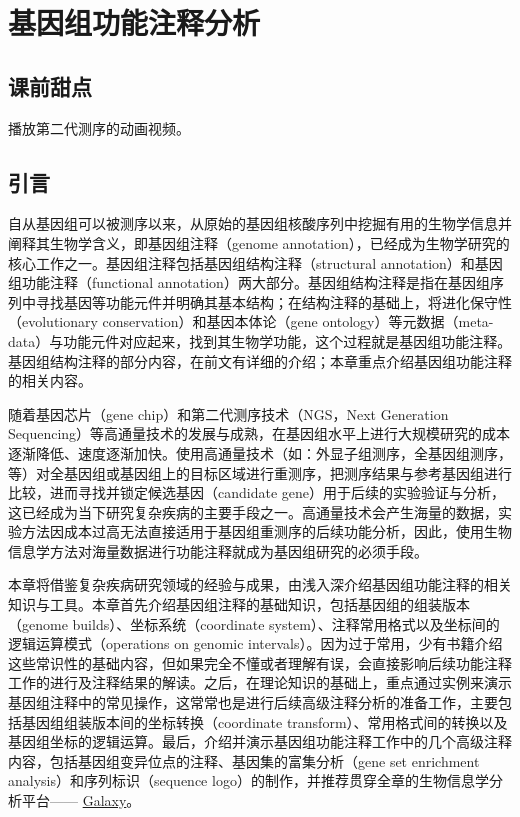 




\setcounter{chapter}{4}
\chapter{基因组功能注释分析}

\section{课前甜点}  
播放第二代测序的动画视频。

\section{引言}
自从基因组可以被测序以来，从原始的基因组核酸序列中挖掘有用的生物学信息并阐释其生物学含义，即基因组注释（genome annotation），已经成为生物学研究的核心工作之一。基因组注释包括基因组结构注释（structural annotation）和基因组功能注释（functional annotation）两大部分。基因组结构注释是指在基因组序列中寻找基因等功能元件并明确其基本结构；在结构注释的基础上，将进化保守性（evolutionary conservation）和基因本体论（gene ontology）等元数据（meta-data）与功能元件对应起来，找到其生物学功能，这个过程就是基因组功能注释。基因组结构注释的部分内容，在前文有详细的介绍；本章重点介绍基因组功能注释的相关内容。

随着基因芯片（gene chip）和第二代测序技术（NGS，Next Generation Sequencing）等高通量技术的发展与成熟，在基因组水平上进行大规模研究的成本逐渐降低、速度逐渐加快。使用高通量技术（如：外显子组测序，全基因组测序，等）对全基因组或基因组上的目标区域进行重测序，把测序结果与参考基因组进行比较，进而寻找并锁定候选基因（candidate gene）用于后续的实验验证与分析，这已经成为当下研究复杂疾病的主要手段之一。高通量技术会产生海量的数据，实验方法因成本过高无法直接适用于基因组重测序的后续功能分析，因此，使用生物信息学方法对海量数据进行功能注释就成为基因组研究的必须手段。

本章将借鉴复杂疾病研究领域的经验与成果，由浅入深介绍基因组功能注释的相关知识与工具。本章首先介绍基因组注释的基础知识，包括基因组的组装版本（genome builds）、坐标系统（coordinate system）、注释常用格式以及坐标间的逻辑运算模式（operations on genomic intervals）。因为过于常用，少有书籍介绍这些常识性的基础内容，但如果完全不懂或者理解有误，会直接影响后续功能注释工作的进行及注释结果的解读。之后，在理论知识的基础上，重点通过实例来演示基因组注释中的常见操作，这常常也是进行后续高级注释分析的准备工作，主要包括基因组组装版本间的坐标转换（coordinate transform）、常用格式间的转换以及基因组坐标的逻辑运算。最后，介绍并演示基因组功能注释工作中的几个高级注释内容，包括基因组变异位点的注释、基因集的富集分析（gene set enrichment analysis）和序列标识（sequence logo）的制作，并推荐贯穿全章的生物信息学分析平台—— \href{http://galaxyproject.org}{Galaxy}。

